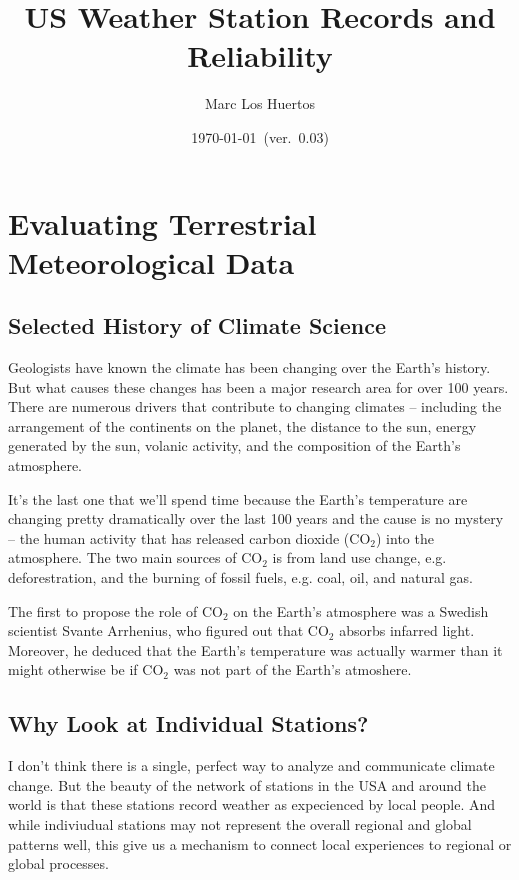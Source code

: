 \documentclass{article}
\title{US Weather Station Records and Reliability} %
\author{Marc Los Huertos}
\date{\today~(ver.~0.03)}
\begin{document}
\maketitle

\tableofcontents

\section{Evaluating Terrestrial Meteorological Data}

\subsection{Selected History of Climate Science}

Geologists have known the climate has been changing over the Earth's history. But what causes these changes has been a major research area for over 100 years. There are numerous drivers that contribute to changing climates -- including the arrangement of the continents on the planet, the distance to the sun, energy generated by the sun, volanic activity, and the composition of the Earth's atmosphere. 

It's the last one that we'll spend time because the Earth's temperature are changing pretty dramatically over the last 100 years and the cause is no mystery -- the human activity that has released carbon dioxide (CO$_2$) into the atmosphere. The two main sources of CO$_2$ is from land use change, e.g. deforestration, and the burning of fossil fuels, e.g. coal, oil, and natural gas. 

The first to propose the role of CO$_2$ on the Earth's atmosphere was a Swedish scientist Svante Arrhenius, who figured out that CO$_2$ absorbs infarred light. Moreover, he deduced that the Earth's temperature was actually warmer than it might otherwise be if CO$_2$ was not part of the Earth's atmoshere. 

\subsection{Why Look at Individual Stations?}

I don't think there is a single, perfect way to analyze and communicate climate change. But the beauty of the network of stations in the USA and around the world is that these stations record weather as expecienced by local people. And while indiviudual stations may not represent the overall regional and global patterns well, this give us a mechanism to connect local experiences to regional or global processes. 
\end{document}
